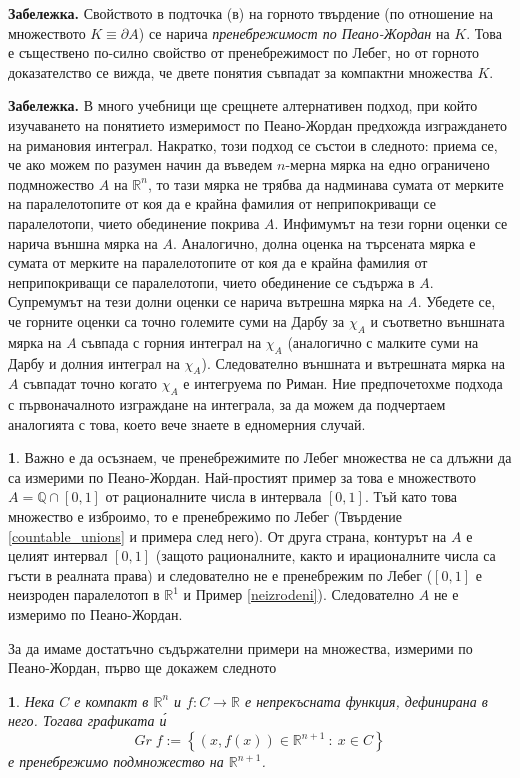 \documentclass[11pt]{article}
\numberwithin{equation}{section}
\numberwithin{figure}{section}
\numberwithin{table}{section}
\theoremstyle{plain}
\theoremstyle{definition}
\theoremstyle{remark}
\theoremstyle{definition}
\theoremstyle{remark}
\theoremstyle{plain}
\theoremstyle{definition}
\theoremstyle{definition}
\newtheorem{example}[thm]{\protect\examplename}
\theoremstyle{plain}
\theoremstyle{plain}
\newtheorem{prop}[thm]{\protect\propositionname}
\theoremstyle{plain}
\theoremstyle{definition}
\theoremstyle{plain}
\providecommand{\examplename}{Пример}
\providecommand{\propositionname}{Твърдение}
\newcommand*{\R}{\mathbb{R}}
\newcommand*{\Q}{\mathbb{Q}}
\begin{document}
\textbf{Забележка.} Свойството в подточка (в) на горното твърдение (по отношение на множеството $K\equiv \partial A$) се нарича \textit{пренебрежимост по Пеано-Жордан} на $K$. Това е съществено по-силно свойство от пренебрежимост по Лебег, но от горното доказателство се вижда, че двете понятия съвпадат за компактни множества $K$.

\medskip

\textbf{Забележка.} В много учебници ще срещнете алтернативен подход, при който изучаването на понятието измеримост по Пеано-Жордан предхожда изграждането на римановия интеграл. Накратко, този подход се състои в следното: приема се, че ако можем по разумен начин да въведем $n$-мерна мярка на едно ограничено подмножество $A$ на $\R^n$, то тази мярка не трябва да надминава сумата от мерките на паралелотопите от коя да е крайна фамилия от неприпокриващи се паралелотопи, чието обединение покрива $A$. Инфимумът на тези горни оценки се нарича външна мярка на $A$. Аналогично, долна оценка на търсената мярка е сумата от мерките на паралелотопите от коя да е крайна фамилия от неприпокриващи се паралелотопи, чието обединение се съдържа в $A$. Супремумът  на тези долни оценки се нарича вътрешна мярка на $A$. Убедете се, че горните оценки са точно големите суми на Дарбу за $\chi_A$ и съответно външната мярка на $A$ съвпада с горния интеграл на $\chi_A$ (аналогично с малките суми на Дарбу и долния интеграл на $\chi_A$). Следователно външната и вътрешната мярка на $A$ съвпадат точно когато $\chi_A$ е интегруема по Риман. Ние предпочетохме подхода с първоначалното изграждане на интеграла, за да можем да подчертаем аналогията с това, което вече знаете в едномерния случай.

\begin{example}
Важно е да осъзнаем, че пренебрежимите по Лебег множества не са длъжни да са измерими по Пеано-Жордан. Най-простият пример за това е множеството $A=\Q \cap [0,1]$ от рационалните числа в интервала $[0,1]$. Тъй като това множество е изброимо, то е пренебрежимо по Лебег (Твърдение \ref{countable_unions} и примера след него). От друга страна, контурът на $A$ е целият интервал $[0,1]$ (защото рационалните, както и ирационалните числа са гъсти в реалната права) и следователно не е пренебрежим по Лебег ($[0,1]$ е неизроден паралелотоп в $\R^1$ и Пример \ref{neizrodeni}). Следователно $A$ не е измеримо по Пеано-Жордан. \end{example}

\medskip

За да имаме достатъчно съдържателни примери на множества, измерими по Пеано-Жордан, първо ще докажем следното
\begin{prop}\label{negligible_graphics}
Нека $C$ е компакт в $\R^n$ и $f:C\longrightarrow \R$ е непрекъсната функция, дефинирана в него. Тогава графиката \'{и}
$$Gr \; f := \left\{ (x,f(x))\in \R^{n+1} \ : \ x\in C\right\}$$
е пренебрежимо подмножество на $\R^{n+1}$.
\end{prop}
\end{document}
